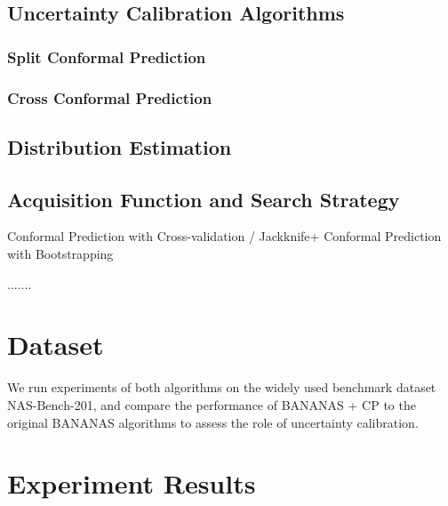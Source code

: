 \documentclass[a4paper,oneside,bibliography=totoc]{scrbook}
\begin{document}
{{\begin{algorithm}[t]
\begin{algorithmic}[1]
{\begin{enumerate}
{			\item Denote $a_{t+1}$ as the candidate architecture with maximum $\myfunc{\phi(a)}$; evaluate $\myfunc{f(a_{t+1})}$.
			\item $\mathcal{A}_{t+1} \leftarrow{\mathcal{A}_{t} \cup \{{a_{t+1}\}}$
		\end{enumerate}
    \ENDFOR 
    \STATE \textbf{Output:} $a^{*}=\operatorname*{argmin}_{t=0,...,T} f(a_{t})$    
  \end{algorithmic}
\end{algorithm}




\section{Uncertainty Calibration Algorithms}
\label{sec:cp}
\subsection{Split Conformal Prediction}
\subsection{Cross Conformal Prediction}
\section{Distribution Estimation}
\label{sec:distest}
\section{Acquisition Function and Search Strategy}
\label{sec:acq}



{Conformal Prediction with Cross-validation / Jackknife+}
{Conformal Prediction with Bootstrapping}

.......
\chapter{Dataset}
\label{Dataset}
We run experiments of both algorithms on the widely used benchmark dataset NAS-Bench-201, and compare the performance of BANANAS + CP to the original BANANAS algorithms to assess the role of uncertainty calibration.
\chapter{Experiment Results}



}}
\end{document}
